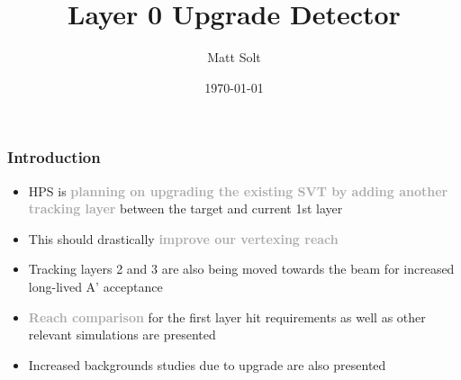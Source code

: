 \documentclass{beamer}
\title[L0 Upgrade]{Layer 0 Upgrade Detector} %
\author{Matt Solt} %
\institute[Stanford] %
{
SLAC National Accelerator Laboratory \\ %
\medskip
\textit{mrsolt@slac.stanford.edu} %
}
\date{\today} %
\begin{document}
\begin{frame}
\titlepage %
\end{frame}




\begin{frame}
\frametitle{Introduction}
\begin{itemize}
\item HPS is \textcolor{darkgray}{\textbf{planning on upgrading the existing SVT by adding another tracking layer}} between the target and current 1st layer
\item This should drastically \textcolor{darkgray}{\textbf{improve our vertexing reach}}
\item Tracking layers 2 and 3 are also being moved towards the beam for increased long-lived A' acceptance
\item \textcolor{darkgray}{\textbf{Reach comparison}} for the first layer hit requirements as well as other relevant simulations are presented
\item Increased backgrounds studies due to upgrade are also presented
\end{itemize}

\end{frame}


\end{document}
